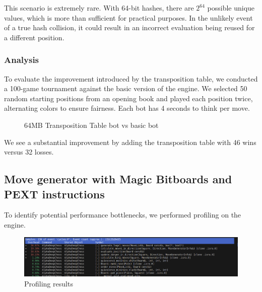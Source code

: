 \vspace{1em}

\noindent This scenario is extremely rare. With 64-bit hashes, there are $2^{64}$ possible unique values, which is more than sufficient for practical purposes. In the unlikely event of a true hash collision, it could result in an incorrect evaluation being reused for a different position.

\subsubsection{Analysis}

To evaluate the improvement introduced by the transposition table, we conducted a 100-game tournament against the basic version of the engine. We selected 50 random starting positions from an opening book and played each position twice, alternating colors to ensure fairness. Each bot has 4 seconds to think per move.

\begin{center}
\begin{figure}[H]
    \centering
    \caption{64MB Transposition Table bot vs basic bot}
    \label{fig:results_transposition_table_bot}
\end{figure}
\medskip
\end{center}

\noindent We see a substantial improvement by adding the transposition table with 46 wins versus 32 losses.

\subsection{Move generator with Magic Bitboards and PEXT instructions}

To identify potential performance bottlenecks, we performed profiling on the engine.

\begin{center}
    \begin{figure}[H]
    \centering
        \includegraphics[width=1.0\textwidth]{Imagenes/basic_move_generator_profiling.png}
        \caption{Profiling results}
        \label{fig:profiling}
    \end{figure}
    \medskip
\end{center}


